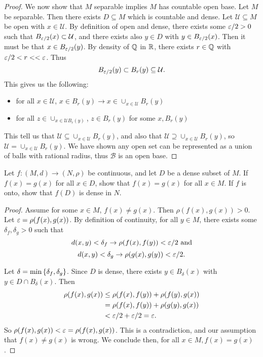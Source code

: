 \documentclass{exam}
\begin{document}
\begin{questions}
\begin{proof}
        We now show that $M$ separable implies $M$ has countable open base. Let $M$ be separable. Then there exists $D\subseteq M$ which 
        is countable and dense. Let $\mathcal{U}\subseteq M$ be open with $x\in \mathcal{U}$. By definition of open and dense, there exists some
        $\varepsilon / 2 > 0$ such that $B_{\varepsilon / 2}(x) \subset \mathcal{U}$, and there exists also $y\in D$ with $y\in B_{\varepsilon / 2}(x)$. Then it must 
        be that $x\in B_{\varepsilon / 2}(y)$. By density of $\mathbb {Q}$ in $\mathbb {R}$, there exists $r\in\mathbb {Q}$ with $\varepsilon / 2 < r <  < \varepsilon$. Thus
        $$B_{\varepsilon / 2}(y) \subset B_r(y) \subseteq \mathcal{U}.$$
        This gives us the following: 
        \begin{itemize}
            \item for all $x\in \mathcal{U}$, $x\in B_r(y)\rightarrow x\in \cup_{x\in\mathcal{U}}B_r(y)$
            \item for all $z\in \cup_{x\in\mathcal{U}B_r(y)}$, $z\in B_r(y)$ for some $x, B_r(y)$
        \end{itemize}

        This tell us that $\mathcal{U} \subseteq \cup_{x\in\mathcal{U}}B_r(y)$, and also that
        $\mathcal{U} \supseteq \cup_{x\in\mathcal{U}}B_r(y)$, so $\mathcal{U} = \cup_{x\in\mathcal{U}}B_r(y)$. We have shown any open set
        can be represented as a union of balls with rational radius, thus $\mathcal{B}$ is an open base.
    \end{proof}


    \newpage
    \question Let $f: (M,d)\to(N, \rho)$ be continuous, and let $D$ be a dense subset of $M$. If $f(x) = g(x)$ for all $x\in D$, 
    show that $f(x) = g(x)$ for all $x\in M$. If $f$ is onto, show that $f(D)$ is dense in $N$.
    \begin{proof}
        Assume for some $x\in M$, $f(x) \neq g(x)$. Then $\rho(f(x), g(x)) > 0$. Let $\varepsilon = \rho (f(x), g(x))$. By definition of continuity,
        for all $y\in M$, there exists some $\delta_f, \delta_g > 0$ such that
        $$d(x, y) < \delta_f \rightarrow \rho (f(x), f(y)) < \varepsilon / 2 \text{ and}$$
        $$d(x, y) < \delta_g \rightarrow \rho (g(x), g(y)) < \varepsilon / 2.$$

        Let $\delta = \min\left \{ \delta_f, \delta_g \right \}$. Since $D$ is dense, there exists $y\in B_\delta(x)$ with $y\in D\cap B_\delta(x)$. Then
        \begin{align*}
            \rho (f(x), g(x)) &\leq \rho (f(x), f(y)) + \rho (f(y), g(x)) \\
            &= \rho (f(x), f(y)) + \rho (g(y), g(x)) \\
            &< \varepsilon / 2 + \varepsilon / 2 = \varepsilon.
        \end{align*}
        So $\rho (f(x), g(x)) < \varepsilon = \rho (f(x), g(x))$. This is a contradiction, and our assumption that $f(x) \neq g(x)$ is wrong. We conclude then, for all $x\in M, f(x) = g(x)$.


\end{proof}
\end{questions}
\end{document}
